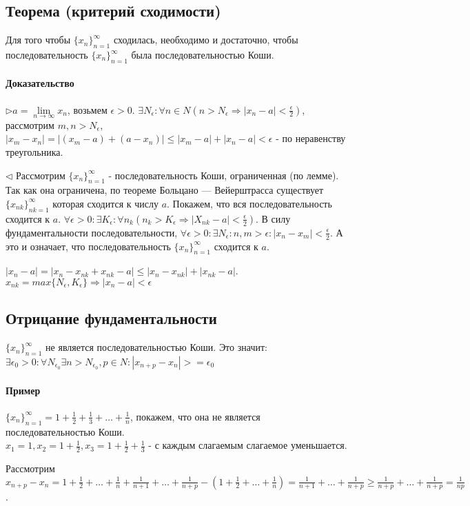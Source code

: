 \documentclass[10pt]{article}
\newcommand{\limninf}{\lim\limits_{n \to \infty}}
\newcommand{\seq}[2]{ \{#1_{#2}\}_{#2=1}^\infty}
\newcommand{\seqn}[1]{\seq{#1}{n}}
\begin{document}
		\subsection{Теорема (критерий сходимости)}
		Для того чтобы	$\seqn{x}$ сходилась, необходимо и достаточно, чтобы последовательность $\seqn{x}$ была последовательностью Коши.
		\paragraph{Доказательство}
			$\rhd a = \limninf x_n$, возьмем $\epsilon > 0$. $\exists N_\epsilon : \forall n \in N (n > N_\epsilon \Rightarrow |x_n - a| < \frac{\epsilon}{2})$, рассмотрим $m, n > N_\epsilon$, $|x_m - x_n| = |(x_m - a) + (a - x_n)| \le |x_m-a| + |x_n - a| < \epsilon$ - по неравенству треугольника.
			
			$\lhd$ Рассмотрим $\seqn{x}$ - последовательность Коши, ограниченная (по лемме). Так как она ограничена, по теореме Больцано — Вейерштрасса существует $\seq{x}{nk}$ которая сходится к числу $a$. 
			Покажем, что вся последовательность сходится к $a$. $\forall \epsilon > 0 : \exists K_\epsilon : \forall n_k (n_k > K_\epsilon \Rightarrow |X_{nk} - a| < \frac{\epsilon}{2})$. В силу фундаментальности последовательности, $\forall \epsilon > 0 : \exists N_\epsilon : n, m > \epsilon : |x_n - x_m| < \frac{\epsilon}{2}$. А это и означает, что последовательность $\seqn{x}$ сходится к $a$.
			
			$|x_n - a| = |x_n - x_{nk} + x_{nk} - a| \le |x_{n} - x_{nk}| + |x_{nk} - a|$. $x_{nk} = max\{N_\epsilon, K_\epsilon\} \Rightarrow |x_n - a| < \epsilon$
		\subsection{Отрицание фундаментальности}
			$\seqn{x}$ не является последовательностью Коши. Это значит: $\exists \epsilon_0 > 0 : \forall N_{\epsilon_0} \exists n > N_{\epsilon_0}, p \in N : |x_{n+p} - x_n| >= \epsilon_0$
			
			\paragraph{Пример}
			$\seqn{x} = 1 + \frac{1}{2} + \frac{1}{3} + \dots + \frac{1}{n}$, покажем, что она не является последовательностью Коши. \\$x_1 = 1, x_2 = 1 + \frac{1}{2}, x_3 = 1 + \frac{1}{2} + \frac{1}{3}$ - с каждым слагаемым слагаемое уменьшается.
			
			Рассмотрим $x_{n+p} - x_n = 1 + \frac{1}{2} + \dots + \frac{1}{n} + \frac{1}{n+1} + \dots + \frac{1}{n+p} - (1 + \frac{1}{2} + \dots + \frac{1}{n}) = \frac{1}{n+1} + \dots + \frac{1}{n+p} \geq \frac{1}{n+p} + \dots + \frac{1}{n + p} = \frac{1}{np}$.
	
\end{document}
